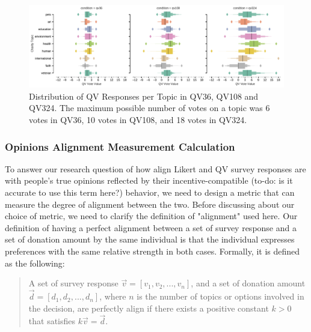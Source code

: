 \begin{figure}[htpb]
    \centering
    \includegraphics[width=\textwidth, keepaspectratio=true]{content/image/qv_distribution_per_topic.pdf}
    \caption{
      Distribution of QV Responses per Topic in QV36, QV108 and QV324. The maximum possible number of votes on a topic was 6 votes in QV36, 10 votes in QV108, and 18 votes in QV324.
    }
    \label{fig:qv3_exp1}
\end{figure}


\subsubsection{Opinions Alignment Measurement Calculation}

To answer our research question of how align Likert and QV survey responses are with people's true opinions reflected by their incentive-compatible (to-do: is it accurate to use this term here?) behavior, we need to design a metric that can measure the degree of alignment between the two. Before discussing about our choice of metric, we need to clarify the definition of "alignment" used here. Our definition of having a perfect alignment between a set of survey response and a set of donation amount by the same individual is that the individual expresses preferences with the same relative strength in both cases. Formally, it is defined as the following:\\

\begin{quote}
    A set of survey response $\vec{v} = [v_1, v_2, ..., v_n]$, and a set of donation amount $\vec{d} = [d_1, d_2, ..., d_n]$, where $n$ is the number of topics or options involved in the decision, are perfectly align if there exists a positive constant $k>0$ that satisfies $k\vec{v} = \vec{d}$.
\end{quote}

